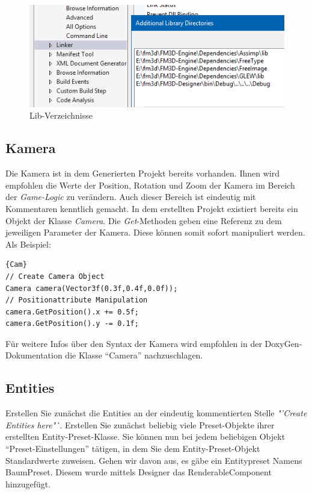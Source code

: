 \begin{figure}
	\begin{center}
		\includegraphics[width=\textwidth]{04verwendung/Engine/lib.png}
		\caption{Lib-Verzeichnisse}\label{liblib}
	\end{center}
\end{figure}

\subsection{Kamera}
Die Kamera ist in dem Generierten Projekt bereits vorhanden. Ihnen wird empfohlen die Werte der Position, Rotation und Zoom der Kamera im Bereich der \textit{Game-Logic} zu verändern. Auch dieser Bereich ist eindeutig mit Kommentaren kenntlich gemacht.
In dem erstellten Projekt existiert bereits ein Objekt der Klasse \textit{Camera}. Die \textit{Get}-Methoden geben eine Referenz zu dem jeweiligen Parameter der Kamera. Diese können somit sofort manipuliert werden. Als Beispiel:
\begin{lstlisting}{Cam}
// Create Camera Object
Camera camera(Vector3f(0.3f,0.4f,0.0f));
// Positionattribute Manipulation
camera.GetPosition().x += 0.5f;
camera.GetPosition().y -= 0.1f;
\end{lstlisting}
Für weitere Infos über den Syntax der Kamera wird empfohlen in der DoxyGen-Dokumentation die Klasse "`Camera"' nachzuschlagen.

\subsection{Entities}
Erstellen Sie zunächst die Entities an der eindeutig kommentierten Stelle \textit{"'Create Entities here"`}. Erstellen Sie zunächst beliebig viele Preset-Objekte ihrer erstellten Entity-Preset-Klasse. Sie können nun bei jedem beliebigen Objekt "`Preset-Einstellungen"' tätigen, in dem Sie dem Entity-Preset-Objekt Standardwerte zuweisen. Gehen wir davon aus, es gäbe ein Entitypreset Namens BaumPreset. Diesem wurde mittels Designer das RenderableComponent hinzugefügt.

